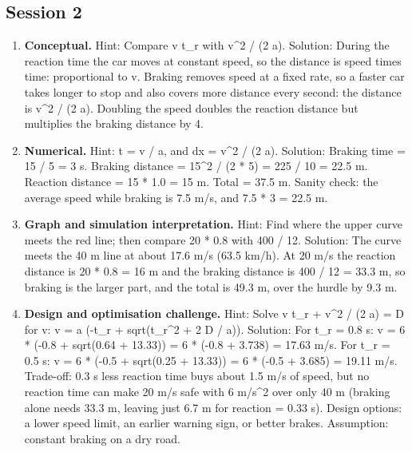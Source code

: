 \documentclass[11pt,a4paper]{article}
\begin{document}
\subsection*{Session 2}
\begin{enumerate}[nosep]
\item \textbf{Conceptual.} Hint: Compare v t\_r with v\textasciicircum{}2 / (2 a). Solution: During the reaction time the car moves at constant speed, so the distance is speed times time: proportional to v. Braking removes speed at a fixed rate, so a faster car takes longer to stop and also covers more distance every second: the distance is v\textasciicircum{}2 / (2 a). Doubling the speed doubles the reaction distance but multiplies the braking distance by 4.
\item \textbf{Numerical.} Hint: t = v / a, and dx = v\textasciicircum{}2 / (2 a). Solution: Braking time = 15 / 5 = 3 s. Braking distance = 15\textasciicircum{}2 / (2 * 5) = 225 / 10 = 22.5 m. Reaction distance = 15 * 1.0 = 15 m. Total = 37.5 m. Sanity check: the average speed while braking is 7.5 m/s, and 7.5 * 3 = 22.5 m.
\item \textbf{Graph and simulation interpretation.} Hint: Find where the upper curve meets the red line; then compare 20 * 0.8 with 400 / 12. Solution: The curve meets the 40 m line at about 17.6 m/s (63.5 km/h). At 20 m/s the reaction distance is 20 * 0.8 = 16 m and the braking distance is 400 / 12 = 33.3 m, so braking is the larger part, and the total is 49.3 m, over the hurdle by 9.3 m.
\item \textbf{Design and optimisation challenge.} Hint: Solve v t\_r + v\textasciicircum{}2 / (2 a) = D for v: v = a (-t\_r + sqrt(t\_r\textasciicircum{}2 + 2 D / a)). Solution: For t\_r = 0.8 s: v = 6 * (-0.8 + sqrt(0.64 + 13.33)) = 6 * (-0.8 + 3.738) = 17.63 m/s. For t\_r = 0.5 s: v = 6 * (-0.5 + sqrt(0.25 + 13.33)) = 6 * (-0.5 + 3.685) = 19.11 m/s. Trade-off: 0.3 s less reaction time buys about 1.5 m/s of speed, but no reaction time can make 20 m/s safe with 6 m/s\textasciicircum{}2 over only 40 m (braking alone needs 33.3 m, leaving just 6.7 m for reaction = 0.33 s). Design options: a lower speed limit, an earlier warning sign, or better brakes. Assumption: constant braking on a dry road.
\end{enumerate}
\end{document}
